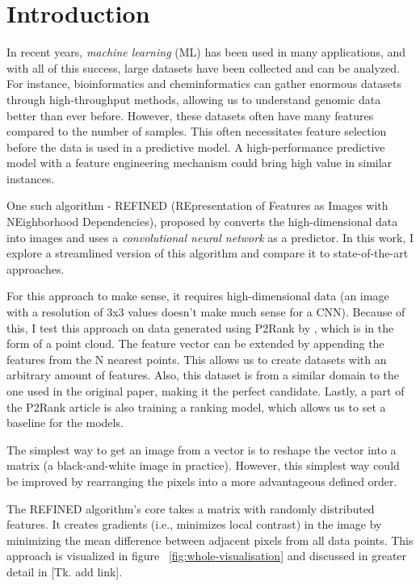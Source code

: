 \chapter*{Introduction}

In recent years, \textit{machine learning} (ML) has been used in many applications, and with all of this success, large datasets have been collected and can be analyzed. For instance, bioinformatics and cheminformatics can gather enormous datasets through high-throughput methods, allowing us to understand genomic data better than ever before. However, these datasets often have many features compared to the number of samples. This often necessitates feature selection before the data is used in a predictive model. A high-performance predictive model with a feature engineering mechanism could bring high value in similar instances.

One such algorithm - REFINED (REpresentation of Features as Images with NEighborhood Dependencies), proposed by \cite{REFINED} converts the high-dimensional data into images and uses a \textit{convolutional neural network} as a predictor. In this work, I explore a streamlined version of this algorithm and compare it to state-of-the-art approaches.

For this approach to make sense, it requires high-dimensional data (an image with a resolution of 3x3 values doesn't make much sense for a CNN). Because of this, I test this approach on data generated using P2Rank by \cite{P2RANK}, which is in the form of a point cloud. The feature vector can be extended by appending the features from the N nearest points. This allows us to create datasets with an arbitrary amount of features. Also, this dataset is from a similar domain to the one used in the original paper, making it the perfect candidate. Lastly, a part of the P2Rank article is also training a ranking model, which allows us to set a baseline for the models.

The simplest way to get an image from a vector is to reshape the vector into a matrix (a black-and-white image in practice). However, this simplest way could be improved by rearranging the pixels into a more advantageous defined order.

The REFINED algorithm's core takes a matrix with randomly distributed features. It creates gradients (i.e., minimizes local contrast) in the image by minimizing the mean difference between adjacent pixels from all data points. This approach is visualized in figure ~\ref{fig:whole-visualisation} and discussed in greater detail in [Tk. add link].

